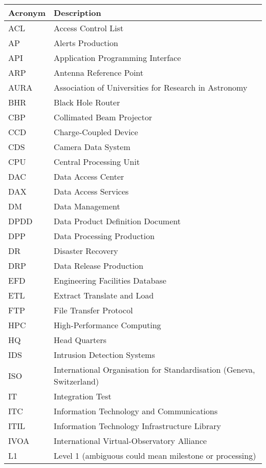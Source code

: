 \addtocounter{table}{-1}
\begin{longtable}{|l|p{}|}\hline
\textbf{Acronym} & \textbf{Description}  \\\hline

ACL & Access Control List \\\hline
AP & Alerts Production \\\hline
API & Application Programming Interface \\\hline
ARP & Antenna Reference Point \\\hline
AURA & Association of Universities for Research in Astronomy \\\hline
BHR & Black Hole Router \\\hline
CBP & Collimated Beam Projector \\\hline
CCD & Charge-Coupled Device \\\hline
CDS & Camera Data System \\\hline
CPU & Central Processing Unit \\\hline
DAC & Data Access Center \\\hline
DAX & Data Access Services \\\hline
DM & Data Management \\\hline
DPDD & Data Product Definition Document \\\hline
DPP & Data Processing Production \\\hline
DR & Disaster Recovery \\\hline
DRP & Data Release Production \\\hline
EFD & Engineering Facilities Database \\\hline
ETL & Extract Translate and Load \\\hline
FTP & File Transfer Protocol \\\hline
HPC & High-Performance Computing \\\hline
HQ & Head Quarters \\\hline
IDS & Intrusion Detection Systems \\\hline
ISO & International Organisation for Standardisation (Geneva, Switzerland) \\\hline
IT & Integration Test \\\hline
ITC & Information Technology and Communications \\\hline
ITIL & Information Technology Infrastructure Library \\\hline
IVOA & International Virtual-Observatory Alliance \\\hline
L1 & Level 1 (ambiguous could mean milestone or processing) \\\hline

\end{longtable}
